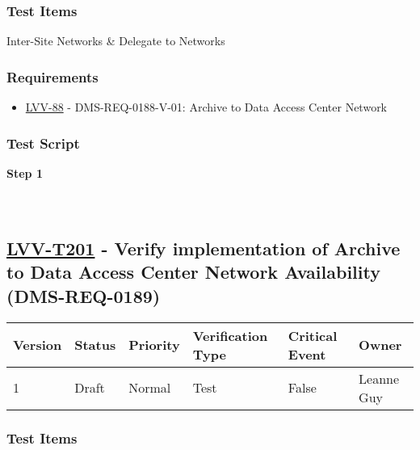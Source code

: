 \hypertarget{test-items-100}{%
\subsubsection{Test Items}\label{test-items-100}}

Inter-Site Networks \& Delegate to Networks

\hypertarget{requirements-100}{%
\subsubsection{Requirements}\label{requirements-100}}

\begin{itemize}
\tightlist
\item
  \href{https://jira.lsstcorp.org/browse/LVV-88}{LVV-88} -
  DMS-REQ-0188-V-01: Archive to Data Access Center Network
\end{itemize}

\hypertarget{test-script-100}{%
\subsubsection{Test Script}\label{test-script-100}}

\textbf{Step 1}\\
~\\
~\\

\hypertarget{lvv-t201---verify-implementation-of-archive-to-data-access-center-network-availability-dms-req-0189}{%
\subsection{\texorpdfstring{\href{https://jira.lsstcorp.org/secure/Tests.jspa\#/testCase/LVV-T201}{LVV-T201}
- Verify implementation of Archive to Data Access Center Network
Availability
(DMS-REQ-0189)}{LVV-T201 - Verify implementation of Archive to Data Access Center Network Availability (DMS-REQ-0189)}}\label{lvv-t201---verify-implementation-of-archive-to-data-access-center-network-availability-dms-req-0189}}

\begin{longtable}[]{@{}llllll@{}}
\toprule
Version & Status & Priority & Verification Type & Critical Event &
Owner\tabularnewline
\midrule
\endhead
1 & Draft & Normal & Test & False & Leanne Guy\tabularnewline
\bottomrule
\end{longtable}

\hypertarget{test-items-101}{%
\subsubsection{Test Items}\label{test-items-101}}

